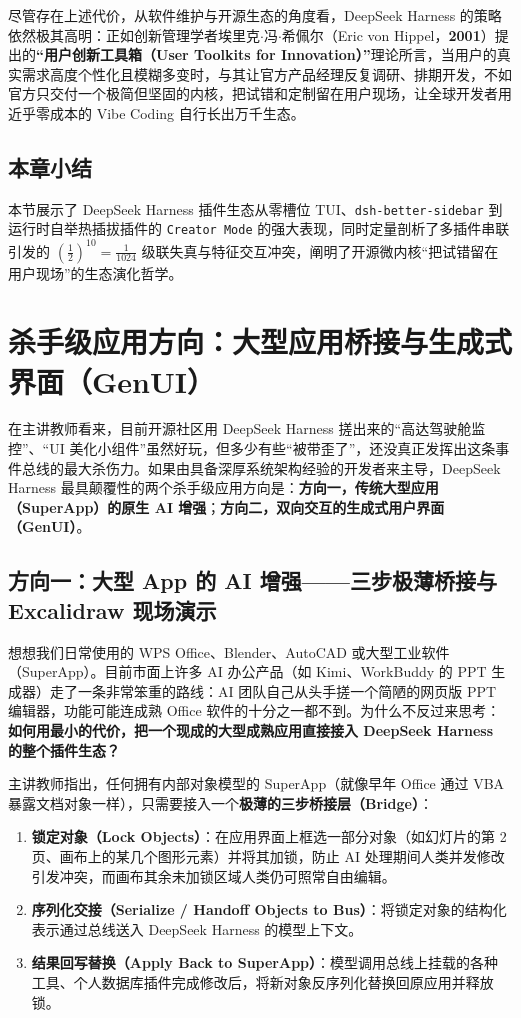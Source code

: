 \documentclass[a4paper]{article}
\begin{document}
尽管存在上述代价，从软件维护与开源生态的角度看，DeepSeek Harness 的策略依然极其高明：正如创新管理学者埃里克$\cdot$冯$\cdot$希佩尔（Eric von Hippel，\textbf{2001}）提出的\textbf{“用户创新工具箱（User Toolkits for Innovation）”}理论所言，当用户的真实需求高度个性化且模糊多变时，与其让官方产品经理反复调研、排期开发，不如官方只交付一个极简但坚固的内核，把试错和定制留在用户现场，让全球开发者用近乎零成本的 Vibe Coding 自行长出万千生态。

\subsection{本章小结}

本节展示了 DeepSeek Harness 插件生态从零槽位 TUI、\texttt{dsh-better-sidebar} 到运行时自举热插拔插件的 \texttt{Creator Mode} 的强大表现，同时定量剖析了多插件串联引发的 $\left(\frac{1}{2}\right)^{10} = \frac{1}{1024}$ 级联失真与特征交互冲突，阐明了开源微内核“把试错留在用户现场”的生态演化哲学。

\section{杀手级应用方向：大型应用桥接与生成式界面（GenUI）}\label{sec:applications}

在主讲教师看来，目前开源社区用 DeepSeek Harness 搓出来的“高达驾驶舱监控”、“UI 美化小组件”虽然好玩，但多少有些“被带歪了”，还没真正发挥出这条事件总线的最大杀伤力。如果由具备深厚系统架构经验的开发者来主导，DeepSeek Harness 最具颠覆性的两个杀手级应用方向是：\textbf{方向一，传统大型应用（SuperApp）的原生 AI 增强}；\textbf{方向二，双向交互的生成式用户界面（GenUI）}。

\subsection{方向一：大型 App 的 AI 增强——三步极薄桥接与 Excalidraw 现场演示}

想想我们日常使用的 WPS Office、Blender、AutoCAD 或大型工业软件（SuperApp）。目前市面上许多 AI 办公产品（如 Kimi、WorkBuddy 的 PPT 生成器）走了一条非常笨重的路线：AI 团队自己从头手搓一个简陋的网页版 PPT 编辑器，功能可能连成熟 Office 软件的十分之一都不到。为什么不反过来思考：\textbf{如何用最小的代价，把一个现成的大型成熟应用直接接入 DeepSeek Harness 的整个插件生态？}

主讲教师指出，任何拥有内部对象模型的 SuperApp（就像早年 Office 通过 VBA 暴露文档对象一样），只需要接入一个\textbf{极薄的三步桥接层（Bridge）}：
\begin{enumerate}
    \item \textbf{锁定对象（Lock Objects）}：在应用界面上框选一部分对象（如幻灯片的第 2 页、画布上的某几个图形元素）并将其加锁，防止 AI 处理期间人类并发修改引发冲突，而画布其余未加锁区域人类仍可照常自由编辑。
    \item \textbf{序列化交接（Serialize / Handoff Objects to Bus）}：将锁定对象的结构化表示通过总线送入 DeepSeek Harness 的模型上下文。
    \item \textbf{结果回写替换（Apply Back to SuperApp）}：模型调用总线上挂载的各种工具、个人数据库插件完成修改后，将新对象反序列化替换回原应用并释放锁。
\end{enumerate}
\end{document}
